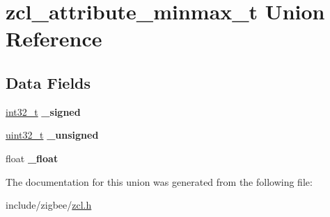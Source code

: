 \hypertarget{unionzcl__attribute__minmax__t}{}\section{zcl\+\_\+attribute\+\_\+minmax\+\_\+t Union Reference}
\label{unionzcl__attribute__minmax__t}
\subsection*{Data Fields}
\begin{DoxyCompactItemize}
\item 
\hyperlink{group__hal__dos_gafd12020da5a235dfcf0c3c748fb5baed}{int32\+\_\+t} {\bfseries \+\_\+signed}
\item 
\hyperlink{group__hal__dos_ga09a1e304d66d35dd47daffee9731edaa}{uint32\+\_\+t} {\bfseries \+\_\+unsigned}
\item 
float {\bfseries \+\_\+float}
\end{DoxyCompactItemize}


The documentation for this union was generated from the following file\+:\begin{DoxyCompactItemize}
\item 
include/zigbee/\hyperlink{zcl_8h}{zcl.\+h}\end{DoxyCompactItemize}
